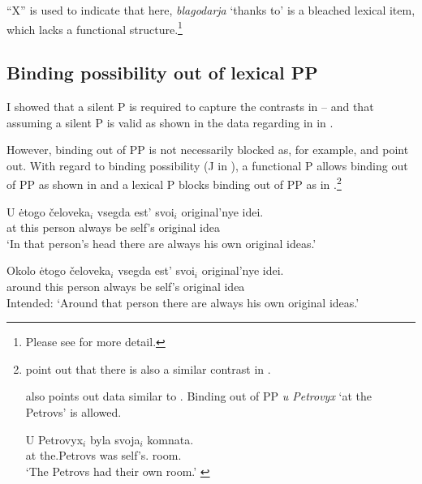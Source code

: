 \documentclass[output=paper,colorlinks,citecolor=brown,newtxmath]{langsci/langscibook}
\begin{document}
\noindent
``X'' is used to indicate that here, \textit{blagodarja} `thanks to' is a bleached lexical item, which lacks a functional structure.\footnote{
			Please see \citet{YadroffFranks2001} for more detail.
			}


\subsection{Binding possibility out of lexical PP}

I showed that a silent P is required to capture the contrasts in --
and that assuming a silent P is valid as shown in the data regarding  in  in .

\largerpage[-4]
However, binding out of PP is not necessarily blocked as, for example, \citet{YadroffFranks2001} and \cite{Bailyn2010} point out.
With regard to binding possibility (J in ), a functional P allows binding out of PP as shown in  and a lexical P blocks binding out of PP as in .\footnote{
			\citet{YadroffFranks2001} point out that there is also a similar contrast in .
			\ea
\hfill \citep[74]{YadroffFranks2001}
			\z\z

			\noindent
			\citet{Bailyn2010} also points out data similar to .
			Binding out of PP \textit{u Petrovyx} `at the Petrovs' is allowed.

			\ea\label{ppbind2}
			\gll	U Petrovyx$_i$ byla svoja$_i$ komnata.\\
					at the.Petrovs was self's.{\NOM} room.{\NOM}\\
			\glt `The Petrovs had their own room.'
			\hfill\citep[14]{Bailyn2010}
			\zlast}

\begin{exe}\ex \label{ppbind}
\begin{xlist}
\ex \label{ppbinda}
\gll	U ėtogo čeloveka$_i$ vsegda est' svoi$_i$ original'nye idei.\\
		at this person always be self's original idea\\\samepage
\trans `In that person's head there are always his own original ideas.'

\ex\label{ppbindb}
\gll	* Okolo ėtogo čeloveka$_i$ vsegda est' svoi$_i$ original'nye idei.\\
		{} around this person always be self's original idea\\
\trans Intended: `Around that person there are always his own original ideas.'
\end{xlist}\samepage\hfill\citep[74]{YadroffFranks2001}
\end{exe}
\end{document}
